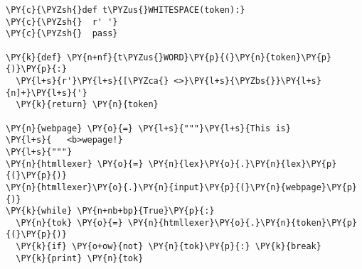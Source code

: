 \begin{Verbatim}[commandchars=\\\{\}]
\PY{c}{\PYZsh{}def t\PYZus{}WHITESPACE(token):}
\PY{c}{\PYZsh{}  r' '}
\PY{c}{\PYZsh{}  pass}

\PY{k}{def} \PY{n+nf}{t\PYZus{}WORD}\PY{p}{(}\PY{n}{token}\PY{p}{)}\PY{p}{:}
  \PY{l+s}{r'}\PY{l+s}{[\PYZca{} <>}\PY{l+s}{\PYZbs{}}\PY{l+s}{n]+}\PY{l+s}{'}
  \PY{k}{return} \PY{n}{token}

\PY{n}{webpage} \PY{o}{=} \PY{l+s}{"""}\PY{l+s}{This is}
\PY{l+s}{   <b>wepage!}
\PY{l+s}{"""}
\PY{n}{htmllexer} \PY{o}{=} \PY{n}{lex}\PY{o}{.}\PY{n}{lex}\PY{p}{(}\PY{p}{)}
\PY{n}{htmllexer}\PY{o}{.}\PY{n}{input}\PY{p}{(}\PY{n}{webpage}\PY{p}{)}
\PY{k}{while} \PY{n+nb+bp}{True}\PY{p}{:}
  \PY{n}{tok} \PY{o}{=} \PY{n}{htmllexer}\PY{o}{.}\PY{n}{token}\PY{p}{(}\PY{p}{)}
  \PY{k}{if} \PY{o+ow}{not} \PY{n}{tok}\PY{p}{:} \PY{k}{break}
  \PY{k}{print} \PY{n}{tok}
\end{Verbatim}
